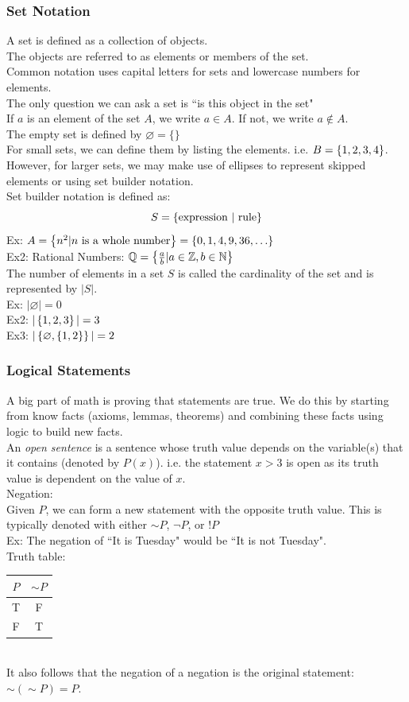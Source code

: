 \documentclass[11pt, fleqn]{article}
\begin{document}
\subsubsection{Set Notation}
A set is defined as a collection of objects.\\
The objects are referred to as elements or members of the set.\\
Common notation uses capital letters for sets and lowercase numbers for elements.\\
The only question we can ask a set is ``is this object in the set"\\
If $a$ is an element of the set $A$, we write $a\in A$. If not, we write $a\notin A$.\\
The empty set is defined by $\varnothing=\{\}$\\
For small sets, we can define them by listing the elements. i.e. $B=\left\{ 1,2,3,4 \right\}$. However, for larger sets, we may make use of ellipses to represent skipped elements or using set builder notation.\\
Set builder notation is defined as:
$$S=\left\{ \text{expression }|\text{ rule} \right\}$$
Ex: $A=\left\{ n^2|\text{$n$ is a whole number} \right\}=\left\{ 0,1,4,9,36,\ldots \right\}$\\
Ex2: Rational Numbers: $\mathbb{Q}=\left\{ \frac{a}{b}|a\in\mathbb{Z},b\in\mathbb{N} \right\}$\\
The number of elements in a set $S$ is called the cardinality of the set and is represented by $|S|$.\\
Ex: $|\varnothing|=0$\\
Ex2: $|\left\{ 1,2,3 \right\}|=3$\\
Ex3: $|\left\{ \varnothing,\left\{ 1,2 \right\} \right\}|=2$\\
\subsubsection{Logical Statements}
A big part of math is proving that statements are true. We do this by starting from know facts (axioms, lemmas, theorems) and combining these facts using logic to build new facts.\\

An \textit{open sentence} is a sentence whose truth value depends on the variable(s) that it contains (denoted by $P(x)$). i.e. the statement $x>3$ is open as its truth value is dependent on the value of $x$.\\

Negation:\\
Given $P$, we can form a new statement with the opposite truth value. This is typically denoted with either $\sim P$, $\neg P$, or $!P$\\
Ex: The negation of ``It is Tuesday" would be ``It is not Tuesday".\\
Truth table:\\
\begin{tabular}{c|c}
$P$ & $\sim P$\\
\hline
T & F\\
F & T
\end{tabular}\\
It also follows that the negation of a negation is the original statement: $\sim(\sim P)=P$.\\
\end{document}
